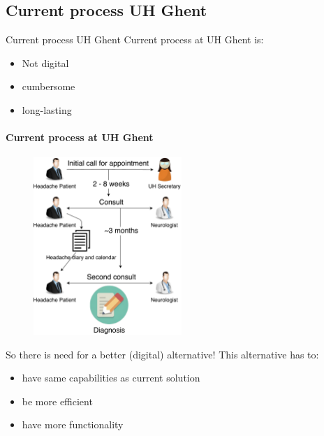 \documentclass[english]{beamer}
\begin{document}
\subsection{Current process UH Ghent}
\begin{frame}{Current process UH Ghent}
	Current process at UH Ghent is:
	\begin{itemize}
		\item Not digital
		\item cumbersome
		\item long-lasting
	\end{itemize}
\end{frame}
\begin{frame}
	\framesubtitle{Current process at UH Ghent}
	\begin{figure}[!h]
		\includegraphics[width=0.5\textwidth]{figures/UZ_patient.pdf}
	\end{figure}
\end{frame}
\begin{frame}
	So there is need for a better (digital) alternative! This alternative has to:
	\begin{itemize}
		\item have same capabilities as current solution
		\item be more efficient
		\item have more functionality
	\end{itemize}
\end{frame}
\end{document}

